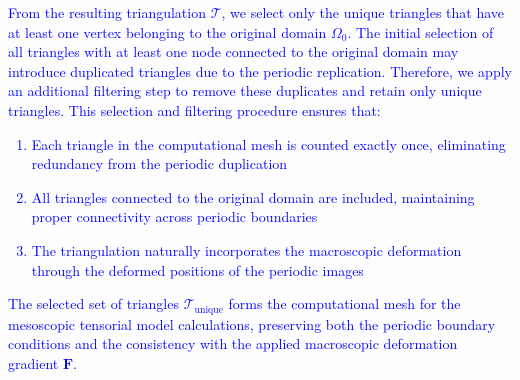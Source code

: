 \documentclass[aps,
superscriptaddress,notitlepage]{revtex4-1}
\begin{document}
\textcolor{blue}{From the resulting triangulation $\mathcal{T}$, we select only the unique triangles that have at least one vertex belonging to the original domain $\Omega_0$. The initial selection of all triangles with at least one node connected to the original domain may introduce duplicated triangles due to the periodic replication. Therefore, we apply an additional filtering step to remove these duplicates and retain only unique triangles.
This selection and filtering procedure ensures that:
\begin{enumerate}
\item Each triangle in the computational mesh is counted exactly once, eliminating redundancy from the periodic duplication
\item All triangles connected to the original domain are included, maintaining proper connectivity across periodic boundaries
\item The triangulation naturally incorporates the macroscopic deformation through the deformed positions of the periodic images
\end{enumerate}
}

\textcolor{blue}{The selected set of triangles $\mathcal{T}_{\text{unique}}$ forms the computational mesh for the mesoscopic tensorial model calculations, preserving both the periodic boundary conditions and the consistency with the applied macroscopic deformation gradient $\mathbf{F}$.}
\end{document}

